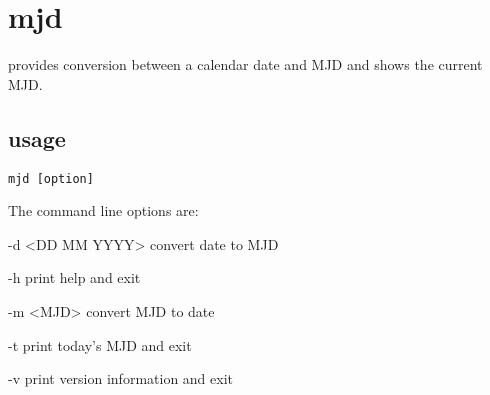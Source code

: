 \section{mjd}

 provides conversion between a calendar date and MJD and shows the current MJD.

\subsection{usage}

\begin{lstlisting}[mathescape=true]
mjd [option]
\end{lstlisting}
The command line options are:
\begin{description*}
\item[-d \textless DD MM YYYY\textgreater] convert date to MJD
\item[-h] print help and exit
\item[-m \textless MJD\textgreater] convert MJD to date
\item[-t] print today's MJD and exit
\item[-v] print version information and exit
\end{description*}

